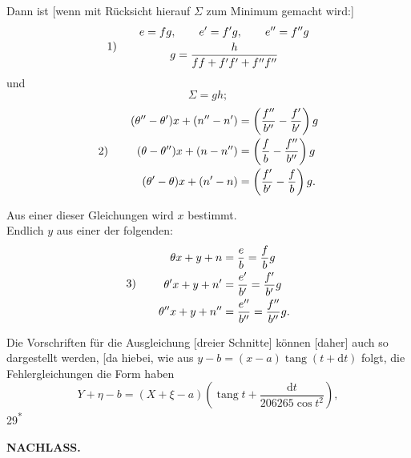 Dann ist [wenn mit Rücksicht hierauf \(\Sigma\) zum Minimum gemacht wird:]
\[
\begin{array}{@{}l@{\qquad}c@{}}
 1)&\begin{gathered}
 e=fg,\qquad e'=f'g,\qquad e''=f''g\\
 g=\frac{h}{ff+f'f'+f''f''}
 \end{gathered}
\end{array}
\]
\noindent und
\[
 \Sigma=gh;
\]
\[
\begin{array}{@{}l@{\qquad}c@{}}
 2)&\begin{aligned}
 (\theta''-\theta')x+(n''-n')&=\left(\frac{f''}{b''}-\frac{f'}{b'}\right)g\\
 (\theta-\theta'')x+(n-n'')&=\left(\frac{f}{b}-\frac{f''}{b''}\right)g\\
 (\theta'-\theta)x+(n'-n)&=\left(\frac{f'}{b'}-\frac{f}{b}\right)g.
 \end{aligned}
\end{array}
\]

Aus einer dieser Gleichungen wird \(x\) bestimmt.\\
\hspace*{\parindent}Endlich \(y\) aus einer der folgenden:
\[
\begin{array}{@{}l@{\qquad}c@{}}
 3)&\begin{aligned}
 \theta x+y+n&=\frac{e}{b}=\frac{f}{b}g\\
 \theta'x+y+n'&=\frac{e'}{b'}=\frac{f'}{b'}g\\
 \theta''x+y+n''&=\frac{e''}{b''}=\frac{f''}{b''}g.
 \end{aligned}
\end{array}
\]

\medskip
Die Vorschriften für die Ausgleichung [dreier Schnitte] können [daher] auch so dargestellt werden, [da hiebei, wie aus \(y-b=(x-a)\operatorname{tang}(t+\mathrm{d}t)\) folgt, die Fehlergleichungen die Form haben
\[
 Y+\eta-b=(X+\xi-a)\left(\operatorname{tang}t+\frac{\mathrm{d}t}{206265\cos t^2}\right),
\]
\noindent\hfill{\small 29\textsuperscript{*}}\hspace*{.12\linewidth}\par

\par\clearpage
\noindent{}\hfill{\small\textbf{NACHLASS.}}\hfill\null\par\medskip

